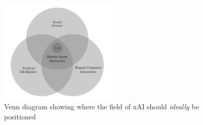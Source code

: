 \begin{figure}[htbp]
\centerline{\includegraphics[width=0.5\textwidth]{literature-review/images/xai-position}}
\caption{Venn diagram showing where the field of xAI should \textit{ideally} be positioned \citep{miller2018explanation}}
\label{fig:xai-position}
\end{figure}

